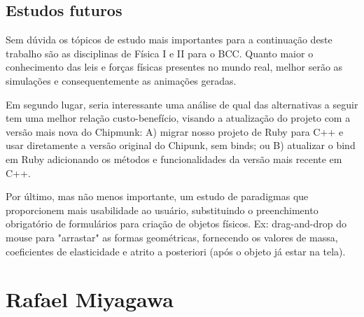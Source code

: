 \subsection{Estudos futuros} 
Sem dúvida os tópicos de estudo mais importantes para a continuação deste trabalho são as disciplinas de Física I e II para o BCC. Quanto maior o conhecimento das leis e forças físicas presentes no mundo real, melhor serão as simulações e consequentemente as animações geradas.

Em segundo lugar, seria interessante uma análise de qual das alternativas a seguir tem uma melhor relação custo-benefício, visando a atualização do projeto com a versão mais nova do Chipmunk: A) migrar nosso projeto de Ruby para C++ e usar diretamente a versão original do Chipunk, sem binds; ou B) atualizar o bind em Ruby adicionando os métodos e funcionalidades da versão mais recente em C++.

Por último, mas não menos importante, um estudo de paradigmas que proporcionem mais usabilidade ao usuário, substituindo o preenchimento obrigatório de formulários para criação de objetos físicos. Ex: drag-and-drop do mouse para "arrastar" as formas geométricas, fornecendo os valores de massa, coeficientes de elasticidade e atrito a posteriori (após o objeto já estar na tela).


\section{Rafael Miyagawa}
